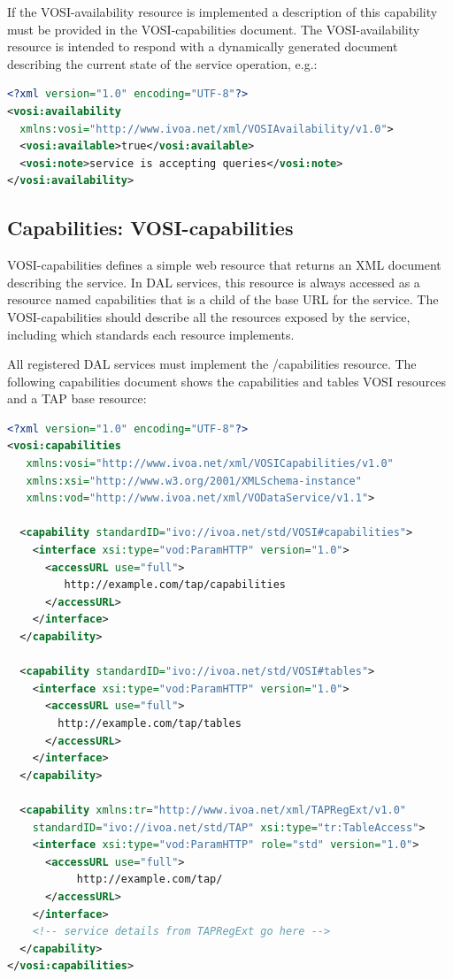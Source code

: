 \documentclass[11pt,letter]{ivoa}
\begin{document}
If the VOSI-availability resource is implemented a description
of this capability must be provided in the VOSI-capabilities document.
The VOSI-availability resource is
intended to respond with a dynamically generated document describing the current state of the service
operation, e.g.:

\begin{lstlisting}[language=XML,basicstyle=\footnotesize]
<?xml version="1.0" encoding="UTF-8"?>
<vosi:availability
  xmlns:vosi="http://www.ivoa.net/xml/VOSIAvailability/v1.0">
  <vosi:available>true</vosi:available>
  <vosi:note>service is accepting queries</vosi:note>
</vosi:availability>
\end{lstlisting}

\subsection{Capabilities: VOSI-capabilities}
\label{sec:vosi-capabilities}
VOSI-capabilities \citep{2017ivoa.spec.0524G} defines a simple web resource that
returns an XML document
describing the service. In  DAL services, this resource is always accessed as a
resource named capabilities that is a child of the base URL for the service. The
VOSI-capabilities should describe all the resources exposed by the service,
including which standards each resource implements.

All registered DAL services must implement the /capabilities resource. The following
capabilities document shows the capabilities and tables VOSI resources
and a TAP base resource:

\begin{lstlisting}[language=XML,basicstyle=\footnotesize]
<?xml version="1.0" encoding="UTF-8"?>
<vosi:capabilities
   xmlns:vosi="http://www.ivoa.net/xml/VOSICapabilities/v1.0"
   xmlns:xsi="http://www.w3.org/2001/XMLSchema-instance"
   xmlns:vod="http://www.ivoa.net/xml/VODataService/v1.1">

  <capability standardID="ivo://ivoa.net/std/VOSI#capabilities">
    <interface xsi:type="vod:ParamHTTP" version="1.0">
      <accessURL use="full">
         http://example.com/tap/capabilities
      </accessURL>
    </interface>
  </capability>

  <capability standardID="ivo://ivoa.net/std/VOSI#tables">
    <interface xsi:type="vod:ParamHTTP" version="1.0">
      <accessURL use="full">
        http://example.com/tap/tables
      </accessURL>
    </interface>
  </capability>

  <capability xmlns:tr="http://www.ivoa.net/xml/TAPRegExt/v1.0"
    standardID="ivo://ivoa.net/std/TAP" xsi:type="tr:TableAccess">
    <interface xsi:type="vod:ParamHTTP" role="std" version="1.0">
      <accessURL use="full">
           http://example.com/tap/
      </accessURL>
    </interface>
    <!-- service details from TAPRegExt go here -->
  </capability>
</vosi:capabilities>
\end{lstlisting}
\end{document}
